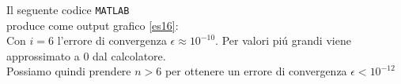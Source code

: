 Il seguente codice \texttt{MATLAB}\\

produce come output grafico \ref{es16}:\\
Con $i=6$ l'errore di convergenza $\epsilon \approx 10^{-10}$.
Per valori pi\'u grandi viene approssimato a 0 dal calcolatore.\\
Possiamo quindi prendere $n>6$ per ottenere un errore di convergenza $\epsilon < 10^{-12}$
